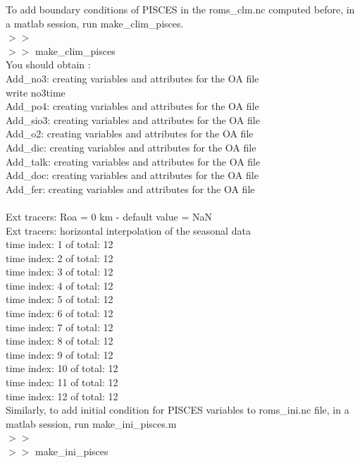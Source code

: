 \noindent To add boundary conditions of PISCES in the roms\_clm.nc computed before,  in a matlab session, run make\_clim\_pisces. \\
\noindent $>>$\\
$>>$ make\_clim\_pisces\\

You should obtain : \\
\noindent Add\_no3: creating variables and attributes for the OA file\\
write no3time\\
Add\_po4: creating variables and attributes for the OA file\\
Add\_sio3: creating variables and attributes for the OA file\\
Add\_o2: creating variables and attributes for the OA file\\
Add\_dic: creating variables and attributes for the OA file\\
Add\_talk: creating variables and attributes for the OA file\\
Add\_doc: creating variables and attributes for the OA file\\
Add\_fer: creating variables and attributes for the OA file\\
 \\
 Ext tracers: Roa = 0 km - default value = NaN\\
 Ext tracers: horizontal interpolation of the seasonal data\\
time index: 1 of total: 12\\
time index: 2 of total: 12\\
time index: 3 of total: 12\\
time index: 4 of total: 12\\
time index: 5 of total: 12\\
time index: 6 of total: 12\\
time index: 7 of total: 12\\
time index: 8 of total: 12\\
time index: 9 of total: 12\\
time index: 10 of total: 12\\
time index: 11 of total: 12\\
time index: 12 of total: 12\\

\noindent Similarly, to add initial condition for PISCES variables to roms\_ini.nc file, in a matlab session, run make\_ini\_pisces.m \\
\noindent $>>$\\
$>>$ make\_ini\_pisces\\

